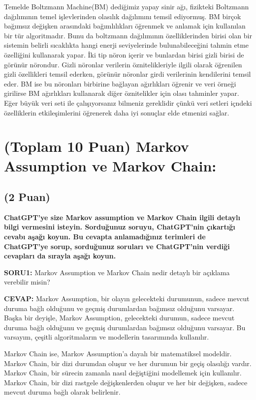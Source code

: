 \documentclass[11pt]{article}
\begin{document}
Temelde Boltzmann Machine(BM) dediğimiz yapay sinir ağı, fizikteki Boltzmann dağılımının temel işlevlerinden olasılık dağılımını temsil ediyormuş. BM birçok bağımsız değişken arasındaki bağımlılıkları öğrenmek ve anlamak için kullanılan bir tür algoritmadır. Bunu da boltzmann dağılımının özelliklerinden birisi olan bir sistemin belirli sıcaklıkta hangi enerji seviyelerinde bulunabileceğini tahmin etme özelliğini kullanarak yapar. İki tip nöron içerir ve bunlardan birisi gizli birisi de görünür nörondur. Gizli nöronlar verilerin öznitelikleriyle ilgili olarak öğrenilen gizli özellikleri temsil ederken, görünür nöronlar girdi verilerinin kendilerini temsil eder. BM ise bu nöronları birbirine bağlayan ağırlıkları öğrenir  ve veri örneği girilirse BM ağırlıkları kullanarak diğer öznitelikler için olası tahminler yapar.  Eğer büyük veri seti ile çalışıyorsanız bilmeniz gereklidir çünkü veri setleri içndeki özelliklerin etkileşimlerini öğrenerek daha iyi sonuçlar elde etmenizi sağlar. 

\section{(Toplam 10 Puan) Markov Assumption ve Markov Chain:}

\subsection{(2 Puan)} \textbf{ChatGPT’ye size Markov assumption ve Markov Chain ilgili detaylı bilgi vermesini isteyin. Sorduğunuz soruyu, ChatGPT'nin çıkartığı cevabı aşağı koyun. Bu cevapta anlamadığınız terimleri de ChatGPT’ye sorup, sorduğunuz soruları ve ChatGPT’nin verdiği cevapları da sırayla aşağı koyun.}

\textbf{SORU1:} Markov Assumption ve Markov Chain nedir detaylı bir  açıklama verebilir misin?

\textbf{CEVAP:} Markov Assumption, bir olayın gelecekteki durumunun, sadece mevcut duruma bağlı olduğunu ve geçmiş durumlardan bağımsız olduğunu varsayar. Başka bir deyişle, Markov Assumption, gelecekteki durumun, sadece mevcut duruma bağlı olduğunu ve geçmiş durumlardan bağımsız olduğunu varsayar. Bu varsayım, çeşitli algoritmaların ve modellerin tasarımında kullanılır.

Markov Chain ise, Markov Assumption'a dayalı bir matematiksel modeldir. Markov Chain, bir dizi durumdan oluşur ve her durumun bir geçiş olasılığı vardır. Markov Chain, bir sürecin zamanla nasıl değiştiğini modellemek için kullanılır. Markov Chain, bir dizi rastgele değişkenlerden oluşur ve her bir değişken, sadece mevcut duruma bağlı olarak belirlenir.
\end{document}

